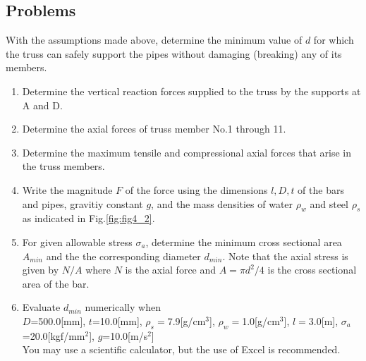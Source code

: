 \documentclass[10pt,a4j]{article}
\begin{document}
\subsection*{Problems}
With the assumptions made above, determine the minimum value of $d$ for which the 
truss can safely support the pipes without damaging (breaking) any of its members. 
\begin{enumerate}
\item
	Determine the vertical reaction forces supplied to the truss by the supports at A and D. 
\item
	Determine the axial forces of truss member No.1 through 11. 
\item
	Determine the maximum tensile and compressional axial forces that arise in the truss members. 
\item
	Write the magnitude $F$ of the force using the dimensions 
	$l,D,t$ of the bars and pipes, gravitiy constant $g$, 
	and the mass densities of water $\rho_w$ and steel $\rho_s$ as 
	indicated in Fig.\ref{fig:fig4_2}. 
\item
	For given allowable stress $\sigma_a$, determine the minimum cross sectional 
	area $A_{min}$ and the the corresponding diameter $d_{min}$. 
	Note that the axial stress is given by $N/A$ where $N$ is the axial force 
	and $A=\pi d^2/4$ is the cross sectional area of the bar.
\item
	Evaluate $d_{min}$ numerically when\\
			$D$=500.0[mm], $t$=10.0[mm], 
			$\rho_s=$7.9[g/cm$^3$],
			$\rho_w=$1.0[g/cm$^3$],
			$l=3.0$[m],
			$\sigma_a$=20.0[kgf/mm$^2$], $g$=10.0[m/s$^2$]\\
	You may use a scientific calculator, but the use of Excel is recommended. 
\end{enumerate}
\end{document}
